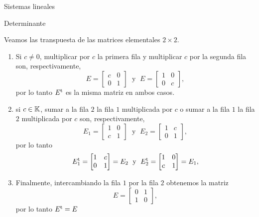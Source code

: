 \begin{chapter}{Sistemas lineales}
\begin{section}{Determinante}
    \begin{ejemplo*} Veamos las transpuesta de las matrices elementales  $2 \times 2$.
        \begin{enumerate}
            \item Si $c \not=0$, multiplicar por  $c$ la primera fila y multiplicar $c$ por la segunda fila son, respectivamente,
            \begin{equation*}
            E = \begin{bmatrix} c& 0\\ 0&1\end{bmatrix}\;\text{ y }\; E = \begin{bmatrix} 1& 0\\ 0&c\end{bmatrix},
            \end{equation*}
            por lo tanto $E^{\operatorname{t}}$ es la misma matriz en ambos casos. 
            \item si  $c \in \mathbb K$, sumar a la fila $2$ la fila $1$ multiplicada por $c$ o sumar a la fila $1$ la fila $2$ multiplicada por $c$ son, respectivamente,
            \begin{equation*}
            E_1 = \begin{bmatrix} 1& 0\\ c&1\end{bmatrix}\;\text{ y }\; E_2 = \begin{bmatrix} 1& c\\ 0&1\end{bmatrix},
            \end{equation*}
            por lo tanto 
            \begin{equation*}
            E_1^{\operatorname{t}} = \begin{bmatrix} 1& c\\ 0&1\end{bmatrix} = E_2 \;\text{ y }\; E_2^{\operatorname{t}} = \begin{bmatrix} 1& 0\\ c&1\end{bmatrix} =E_1,
            \end{equation*}
            \item Finalmente, intercambiando la fila $1$ por la fila $2$ obtenemos la matriz
            \begin{equation*}
            E = \begin{bmatrix} 0& 1\\ 1&0\end{bmatrix},
            \end{equation*}
            por lo tanto $E^{\operatorname{t}} =E$
        \end{enumerate}
    \end{ejemplo*}
    


\end{section}
\end{chapter}
